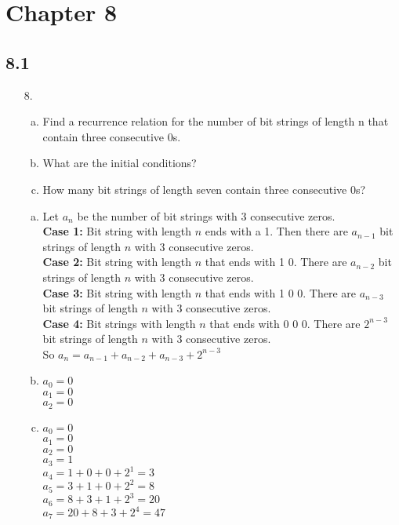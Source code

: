 \section{Chapter 8}
\subsection{8.1}
\begin{itemize}
    \item[8.]
          \begin{enumerate}[a.]
              \item Find a recurrence relation for the number of bit strings of length n that contain three consecutive 0s.
              \item What are the initial conditions?
              \item How many bit strings of length seven contain three consecutive 0s?
          \end{enumerate}
          \answer
          \begin{enumerate}[a.]
              \item Let $a_n$ be the number of bit strings with 3 consecutive zeros.\\
                    \textbf{Case 1:} Bit string with length $n$ ends with a 1. Then there
                    are $a_{n-1}$ bit strings of length $n$ with 3 consecutive zeros. \\
                    \textbf{Case 2:} Bit string with length $n$ that ends with 1 0. There
                    are $a_{n-2}$ bit strings of length $n$ with 3 consecutive zeros. \\
                    \textbf{Case 3:} Bit string with length $n$ that ends with 1 0 0. There
                    are $a_{n-3}$ bit strings of length $n$ with 3 consecutive zeros. \\
                    \textbf{Case 4:} Bit strings with length $n$ that ends with 0 0 0. There
                    are $2^{n-3}$ bit strings of length $n$ with 3 consecutive zeros. \\
                    So $a_n = a_{n-1} + a_{n-2} + a_{n-3} + 2^{n-3}$
              \item $a_0 = 0$ \\
                    $a_1 = 0$ \\
                    $a_2 = 0$ \\

              \item $a_0 = 0$ \\
                    $a_1 = 0$ \\
                    $a_2 = 0$ \\
                    $a_3 = 1$ \\
                    $a_4 = 1 + 0 + 0 + 2^1 = 3$ \\
                    $a_5 = 3 + 1 + 0 + 2^2 = 8$ \\
                    $a_6 = 8 + 3 + 1 + 2^3 = 20$ \\
                    $a_7 = 20 + 8 + 3 + 2^4 = 47$
          \end{enumerate}
\end{itemize}

